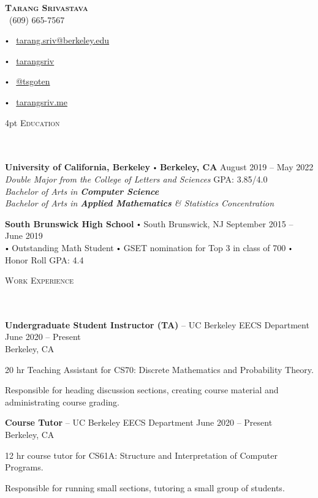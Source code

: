 \documentclass{article}
\newcommand{\contact}[3]{
\vspace*{3pt}
\begin{center}
{\LARGE \scshape {#1}}\\
\vspace{5pt}
#2 
\vspace{2pt}
#3
\end{center}
\vspace*{-8pt}
}
\newcommand{\header}[1]{{
\hspace*{-15pt}\vspace*{6pt} \textsc{#1}} \vspace*{-6pt} 
\lineunder
}
\newcommand{\lineunder}{
\vspace*{-8pt} \\ \hspace*{-18pt} 
\hrulefill \\
}
\newcommand{\school}[5]{\vspace*{2pt}%
\textbf{#1} \labelitemi #2 \hfill #3 \\ #4 \hfill #5
\vspace*{5pt}
}
\newcommand{\college}[7]{
\textbf{#1} \labelitemi \textbf{#2} \hfill #3 \\ #4 \hfill #7 \\ #5 \\ #6 \vspace*{5pt}
}
\newcommand{\employer}[4]{{
\vspace*{2pt}%
\textbf{#1} #2 \hfill #3\\ #4 \vspace*{2pt}}
}
\renewcommand{\labelitemi}{
$\vcenter{\hbox{\tiny$\bullet$}}$\hspace*{3pt}
}
\renewcommand{\labelitemii}{
$\vcenter{\hbox{\tiny$\bullet$}}$\hspace*{-3pt}
}
\newenvironment{bullet-list-minor}{
\begin{list}{\labelitemii}{\setlength\leftmargin{15pt} 
\topsep 0pt \itemsep -2pt}}{\vspace*{4pt}\end{list}
}
\begin{document}
\small
\smallskip
\vspace*{-44pt}

\contact{\textbf{Tarang Srivastava}}
{\faPhone\ (609) 665-7567 
\labelitemi \faEnvelope\ \href{mailto:tarang.sriv@berkeley.edu}{tarang.sriv@berkeley.edu}
\labelitemi \faLinkedin\ \href{https://www.linkedin.com/in/tarangsriv/}{tarangsriv}
\labelitemi \faGithub\ \href{https://github.com/tsgoten}{@tsgoten}%
\labelitemi \faLink\ \href{http://tarangsriv.me}{tarangsriv.me}
}

\vspace{4pt}
\header{Education}
    \college{University of California, Berkeley}{Berkeley, CA}{August 2019 -- May 2022}
    {\textit{Double Major from the College of Letters and Sciences}}
    {\textit{Bachelor of Arts in \textbf{Computer Science}}}
    {\textit{Bachelor of Arts in \textbf{Applied Mathematics} \& Statistics Concentration}}
    {GPA: 3.85/4.0}

    \school{South Brunswick High School}{South Brunswick, NJ}{September 2015 -- June 2019}
    {\labelitemi Outstanding Math Student \labelitemi GSET nomination for Top 3 in class of 700 \labelitemi Honor Roll}
    {GPA: 4.4}

\vspace*{4pt}%
\header{Work Experience}

    \employer{Undergraduate Student Instructor (TA)}
    {-- UC Berkeley EECS Department}{June 2020 -- Present}{Berkeley, CA}
	\begin{bullet-list-minor}
	\item 20 hr Teaching Assistant for CS70: Discrete Mathematics and Probability Theory. 
	\item Responsible for heading discussion sections, creating course material and administrating course grading.  
    \end{bullet-list-minor}

    \employer{Course Tutor}
    {-- UC Berkeley EECS Department}{June 2020 -- Present}{Berkeley, CA}
	\begin{bullet-list-minor}
    \item 12 hr course tutor for CS61A: Structure and Interpretation of Computer Programs. 
    \item Responsible for running small sections, tutoring a small group of students.
    \end{bullet-list-minor}

\end{document}
